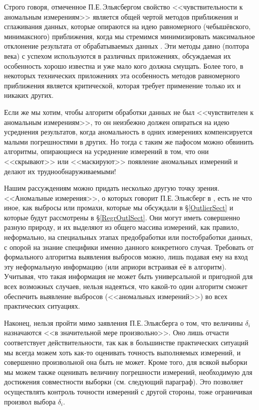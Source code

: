 \documentclass[a5paper,openany]{book}
\begin{document}
Строго говоря, отмеченное П.Е.\,Эльясбергом свойство <<чувствительности к аномальным 
измерениям>> является общей чертой методов приближения и сглаживания данных, которые 
опираются на идею равномерного (чебышёвского, минимаксного) приближения, когда мы 
стремимся минимизировать максимальное отклонение результата от обрабатываемых данных 
\cite{Akhiezer,Remez}. Эти методы давно (полтора века) с успехом используются в различных 
приложениях, обсуждаемая их особенность хорошо известна и уже мало кого должна смущать. 
Более того, в некоторых технических приложениях эта особенность методов равномерного 
приближения является критической, которая требует применение только их и никаких других. 
  
Если же мы хотим, чтобы алгоритм обработки данных не был <<чувствителен к аномальным 
измерениям>>, то он неизбежно должен опираться на идею усреднения результатов, когда 
аномальность в одних измерениях компенсируется малыми погрешностями в других. Но тогда 
с таким же пафосом можно обвинить алгоритмы, опирающиеся на усреднение измерений в том, 
что они <<скрывают>> или <<маскируют>> появление аномальных измерений и делают их 
труднообнаруживаемыми! 
  
Нашим рассуждениям можно придать несколько другую точку зрения. <<Аномальные измерения>>, 
о которых говорит П.Е.\,Эльясберг в \cite{Eliasberg83}, есть не что иное, как выбросы 
или промахи, которые мы обсуждали в \S\ref{OutlierSect} и которые будут рассмотрены в 
\S\ref{RegrOutlSect}. Они могут иметь совершенно разную природу, и их выделяют из общего 
массива измерений, как правило, неформально, на специальных этапах предобработки или 
постобработки данных, с опорой на знание специфики именно данного конкретного случая. 
Требовать от формального алгоритма выявления выбросов можно, лишь подавая ему на вход 
эту неформальную информацию (или априори встраивая её в алгоритм). Учитывая, что такая 
информация не может быть универсальной и пригодной для всех возможных случаев, нельзя 
надеяться, что какой-то один алгоритм сможет обеспечить выявление выбросов (<<аномальных 
измерений>>) во всех практических ситуациях. 
  
Наконец, нельзя пройти мимо заявления П.Е.\,Эльясберга о том, что величины $\delta_i$ 
назначаются <<в значительной мере произвольно>>. Оно лишь отчасти соответствует 
действительности, так как в большинстве практических ситуаций мы всегда можем хоть 
как-то оценивать точность выполняемых измерений, и совершенно произвольной она быть 
не может. Кроме того, для всякой выборки мы можем также оценивать величину погрешности 
измерений, необходимую для достижения совместности выборки (см. следующий параграф). 
Это позволяет осуществлять контроль точности измерений с другой стороны, тоже 
ограничивая произвол выбора $\delta_i$.  
  
\end{document}
